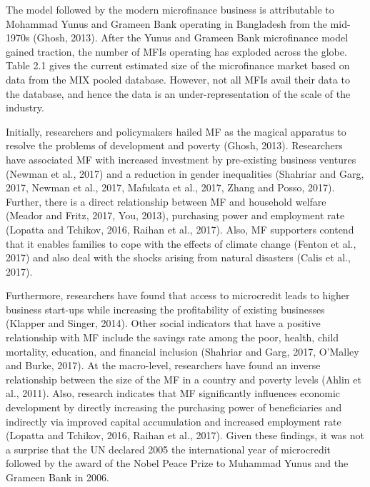 \documentclass[a4paper, nobind]{templates/ociamthesis}
\begin{document}
The model followed by the modern microfinance business is attributable to Mohammad Yunus and Grameen Bank operating in Bangladesh from the mid-1970s (Ghosh, 2013). After the Yunus and Grameen Bank microfinance model gained traction, the number of MFIs operating has exploded across the globe. Table 2.1 gives the current estimated size of the microfinance market based on data from the MIX pooled database. However, not all MFIs avail their data to the database, and hence the data is an under-representation of the scale of the industry.

Initially, researchers and policymakers hailed MF as the magical apparatus to resolve the problems of development and poverty (Ghosh, 2013). Researchers have associated MF with increased investment by pre-existing business ventures (Newman et al., 2017) and a reduction in gender inequalities (Shahriar and Garg, 2017, Newman et al., 2017, Mafukata et al., 2017, Zhang and Posso, 2017). Further, there is a direct relationship between MF and household welfare (Meador and Fritz, 2017, You, 2013), purchasing power and employment rate (Lopatta and Tchikov, 2016, Raihan et al., 2017). Also, MF supporters contend that it enables families to cope with the effects of climate change (Fenton et al., 2017) and also deal with the shocks arising from natural disasters (Calis et al., 2017).

Furthermore, researchers have found that access to microcredit leads to higher business start-ups while increasing the profitability of existing businesses (Klapper and Singer, 2014). Other social indicators that have a positive relationship with MF include the savings rate among the poor, health, child mortality, education, and financial inclusion (Shahriar and Garg, 2017, O'Malley and Burke, 2017). At the macro-level, researchers have found an inverse relationship between the size of the MF in a country and poverty levels (Ahlin et al., 2011). Also, research indicates that MF significantly influences economic development by directly increasing the purchasing power of beneficiaries and indirectly via improved capital accumulation and increased employment rate (Lopatta and Tchikov, 2016, Raihan et al., 2017). Given these findings, it was not a surprise that the UN declared 2005 the international year of microcredit followed by the award of the Nobel Peace Prize to Muhammad Yunus and the Grameen Bank in 2006.

\newpage
\end{document}
